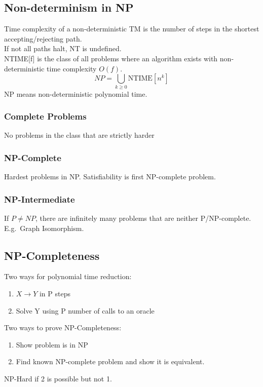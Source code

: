 \subsection{Non-determinism in NP}
Time complexity of a non-deterministic TM is the number of steps in the shortest accepting/rejecting path.\\
If not all paths halt, NT is undefined.\\
NTIME[f] is the class of all problems where an algorithm exists with non-deterministic time complexity $O(f)$.\\
$$NP=\bigcup\limits_{k\geq 0}\text{NTIME}[n^k]$$
NP means non-deterministic polynomial time.

\subsubsection{Complete Problems}
No problems in the class that are strictly harder

\subsubsection{NP-Complete}
Hardest problems in NP. Satisfiability is first NP-complete problem.

\subsubsection{NP-Intermediate}
If $P\neq NP$, there are infinitely many problems that are neither P/NP-complete. E.g.\ Graph Isomorphism.

\subsection{NP-Completeness}
Two ways for polynomial time reduction:
\begin{enumerate}
    \item $X\rightarrow Y$ in P steps
    \item Solve Y using P number of calls to an oracle
\end{enumerate}

Two ways to prove NP-Completeness:
\begin{enumerate}
    \item Show problem is in NP
    \item Find known NP-complete problem and show it is equivalent.
\end{enumerate}

NP-Hard if 2 is possible but not 1.

